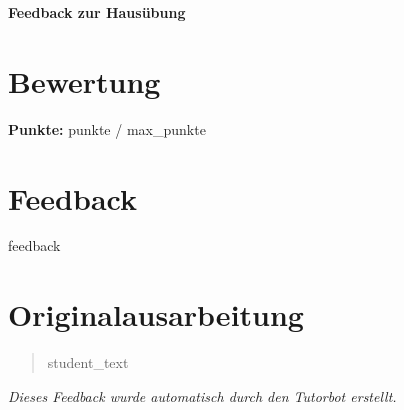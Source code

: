 \documentclass[12pt]{article}
\begin{document}
\begin{center}
    \Huge \textbf{Feedback zur Hausübung}
\end{center}

\vspace{1cm}

\section*{Bewertung}
\textbf{Punkte:} {{ punkte }} / {{ max_punkte }}

\vspace{0.5cm}

\section*{Feedback}
{{ feedback }}

\vspace{0.5cm}

\section*{Originalausarbeitung}

\begin{quote}
{{ student_text }}
\end{quote}


\vspace{0.5cm}

\noindent
\textit{Dieses Feedback wurde automatisch durch den Tutorbot erstellt.}
\end{document}
